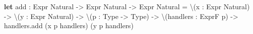 \documentclass[]{article}
\newenvironment{Shaded}{}{}
\newcommand{\CommentTok}[1]{\textcolor[rgb]{0.38,0.63,0.69}{\textit{#1}}}
\newcommand{\KeywordTok}[1]{\textcolor[rgb]{0.00,0.44,0.13}{\textbf{#1}}}
\newcommand{\NormalTok}[1]{#1}
\newcommand{\OperatorTok}[1]{\textcolor[rgb]{0.40,0.40,0.40}{#1}}
\begin{document}
\begin{Shaded}
\begin{Highlighting}[]
\KeywordTok{let}\CommentTok{ }\NormalTok{add}
\CommentTok{    }\NormalTok{:}\CommentTok{ }\NormalTok{Expr}\CommentTok{ }\NormalTok{Natural}\CommentTok{ }\OperatorTok{{-}\textgreater{}}\CommentTok{ }\NormalTok{Expr}\CommentTok{ }\NormalTok{Natural}\CommentTok{ }\OperatorTok{{-}\textgreater{}}\CommentTok{ }\NormalTok{Expr}\CommentTok{ }\NormalTok{Natural}
\CommentTok{    }\NormalTok{=}\CommentTok{ }\OperatorTok{\textbackslash{}}\NormalTok{(x}\CommentTok{ }\NormalTok{:}\CommentTok{ }\NormalTok{Expr}\CommentTok{ }\NormalTok{Natural)}\CommentTok{ }\OperatorTok{{-}\textgreater{}}
\CommentTok{      }\OperatorTok{\textbackslash{}}\NormalTok{(y}\CommentTok{ }\NormalTok{:}\CommentTok{ }\NormalTok{Expr}\CommentTok{ }\NormalTok{Natural)}\CommentTok{ }\OperatorTok{{-}\textgreater{}}
\CommentTok{      }\OperatorTok{\textbackslash{}}\NormalTok{(p}\CommentTok{ }\NormalTok{:}\CommentTok{ }\NormalTok{Type}\CommentTok{ }\OperatorTok{{-}\textgreater{}}\CommentTok{ }\NormalTok{Type)}\CommentTok{ }\OperatorTok{{-}\textgreater{}}
\CommentTok{      }\OperatorTok{\textbackslash{}}\NormalTok{(handlers}\CommentTok{ }\NormalTok{:}\CommentTok{ }\NormalTok{ExprF}\CommentTok{ }\NormalTok{p)}\CommentTok{ }\OperatorTok{{-}\textgreater{}}
\CommentTok{        }\NormalTok{handlers.add}\CommentTok{ }\NormalTok{(x}\CommentTok{ }\NormalTok{p}\CommentTok{ }\NormalTok{handlers)}\CommentTok{ }\NormalTok{(y}\CommentTok{ }\NormalTok{p}\CommentTok{ }\NormalTok{handlers)}


\end{Highlighting}
\end{Shaded}
\end{document}
